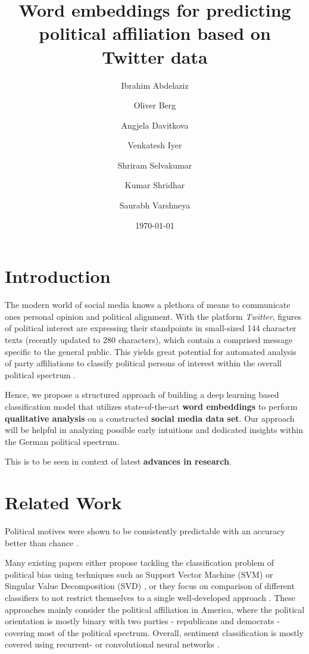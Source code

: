 \documentclass[10pt, oneside]{article}
\title{Word embeddings for predicting political affiliation based on Twitter data}
\author[]{Ibrahim Abdelaziz}
\author[]{Oliver Berg}
\author[]{Angjela Davitkova}
\author[]{Venkatesh Iyer}
\author[]{Shriram Selvakumar}
\author[]{Kumar Shridhar}
\author[]{Saurabh Varshneya}
\affil[1]{Technische Universität Kaiserslautern}
\date{\today}
\begin{document}
\maketitle
\begin{multicols}{2}


\section{Introduction}

The modern world of social media knows a plethora of means to communicate ones personal opinion and political alignment. With the platform \textit{Twitter}, figures of political interest are expressing their standpoints in small-sized 144 character texts (recently updated to 280 characters), which contain a comprised message specific to the general public. This yields great potential for automated analysis of party affiliations to classify political persons of interest within the overall political spectrum \cite{Biessmann2017}.

Hence, we propose a structured approach of building a deep learning based classification model that utilizes state-of-the-art \textbf{word embeddings} \cite{Pelevinala2016} to perform \textbf{qualitative analysis} on a constructed \textbf{social media data set}. Our approach will be helpful in analyzing possible early intuitions and dedicated insights within the German political spectrum.

This is to be seen in context of latest \textbf{advances in research}.


\section{Related Work}

Political motives were shown to be consistently predictable with an accuracy better than chance \cite{Biessmann2017}.

Many existing papers either propose tackling the classification problem of political bias using techniques such as Support Vector Machine (SVM) or Singular Value Decomposition (SVD) \cite{Misra2016}, or they focus on comparison of different classifiers to not restrict themselves to a single well-developed approach \cite{Bhanda2009}. These approaches mainly consider the political affiliation in America, where the political orientation is mostly binary with two parties - republicans and democrats - covering most of the political spectrum.
Overall, sentiment classification is mostly covered using recurrent- or convolutional neural networks \cite{Kim2014}.


\end{multicols}
\end{document}
